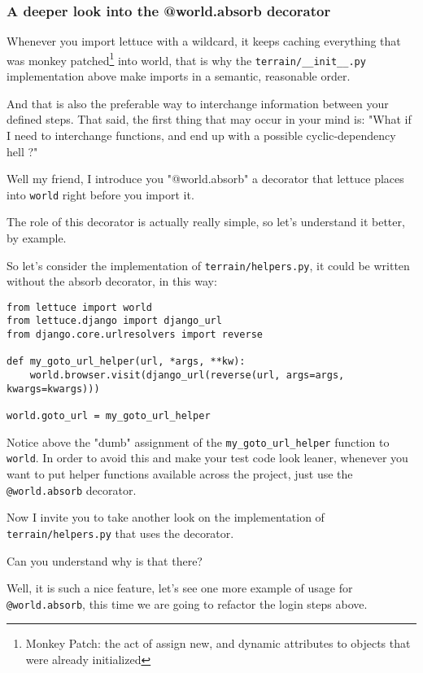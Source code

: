 \documentclass[letterpaper]{article}
\begin{document}
\subsubsection*{A deeper look into the @world.absorb decorator}

Whenever you import lettuce with a wildcard, it keeps caching
everything that was monkey patched\footnote{Monkey Patch: the act of
assign new, and dynamic attributes to objects that were already
initialized } into world, that is why the
\texttt{terrain/\_\_init\_\_.py} implementation above make imports in
a semantic, reasonable order.

\noindent
And that is also the preferable way to interchange information between
your defined steps. That said, the first thing that may occur in your
mind is: "What if I need to interchange functions, and end up with a
possible cyclic-dependency hell ?"

\noindent
Well my friend, I introduce you "@world.absorb" a decorator that
lettuce places into \texttt{world} right before you import it.

\noindent
The role of this decorator is actually really simple, so let's
understand it better, by example.

\noindent
So let's consider the implementation of \texttt{terrain/helpers.py},
it could be written without the absorb decorator, in this way:

\footnotesize
\begin{verbatim}
from lettuce import world
from lettuce.django import django_url
from django.core.urlresolvers import reverse

def my_goto_url_helper(url, *args, **kw):
    world.browser.visit(django_url(reverse(url, args=args, kwargs=kwargs)))

world.goto_url = my_goto_url_helper
\end{verbatim}
\normalsize

\noindent
Notice above the "dumb" assignment of the
\texttt{my\_goto\_url\_helper} function to \texttt{world}. In order to
avoid this and make your test code look leaner, whenever you want to
put helper functions available across the project, just use the
\texttt{@world.absorb} decorator.

\noindent
Now I invite you to take another look on the implementation of
\texttt{terrain/helpers.py} that uses the decorator.

\noindent
Can you understand why is that there?

\noindent
Well, it is such a nice feature, let's see one more example of usage
for \texttt{@world.absorb}, this time we are going to refactor the
login steps above.
\end{document}
